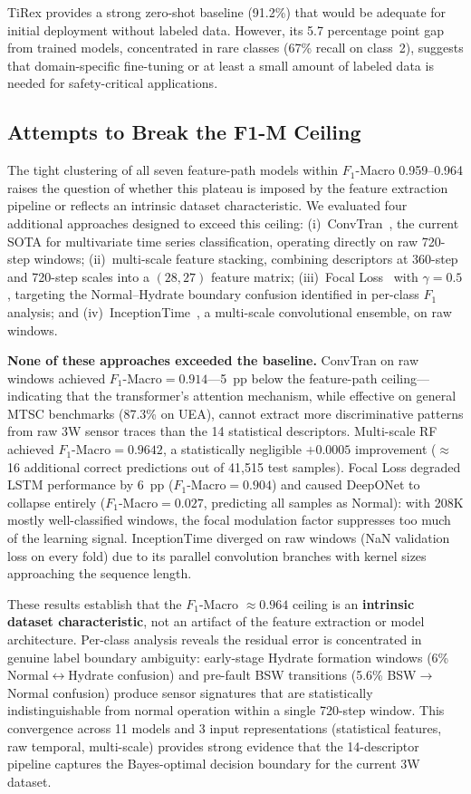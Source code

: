 \documentclass[conference]{IEEEtran}
\begin{document}
TiRex provides a strong zero-shot baseline (91.2\%) that would be adequate for initial deployment without labeled data. However, its 5.7 percentage point gap from trained models, concentrated in rare classes (67\% recall on class~2), suggests that domain-specific fine-tuning or at least a small amount of labeled data is needed for safety-critical applications.

\subsection{Attempts to Break the F1-M Ceiling}

The tight clustering of all seven feature-path models within $F_1$-Macro 0.959--0.964 raises the question of whether this plateau is imposed by the feature extraction pipeline or reflects an intrinsic dataset characteristic. We evaluated four additional approaches designed to exceed this ceiling: (i)~ConvTran~\cite{convtran}, the current SOTA for multivariate time series classification, operating directly on raw 720-step windows; (ii)~multi-scale feature stacking, combining descriptors at 360-step and 720-step scales into a $(28, 27)$ feature matrix; (iii)~Focal Loss~\cite{focalloss} with $\gamma{=}0.5$, targeting the Normal--Hydrate boundary confusion identified in per-class $F_1$ analysis; and (iv)~InceptionTime~\cite{inceptiontime}, a multi-scale convolutional ensemble, on raw windows.

\textbf{None of these approaches exceeded the baseline.} ConvTran on raw windows achieved $F_1$-Macro${=}0.914$---5~pp below the feature-path ceiling---indicating that the transformer's attention mechanism, while effective on general MTSC benchmarks (87.3\% on UEA), cannot extract more discriminative patterns from raw 3W sensor traces than the 14 statistical descriptors. Multi-scale RF achieved $F_1$-Macro${=}0.9642$, a statistically negligible $+0.0005$ improvement ($\approx$16 additional correct predictions out of 41{,}515 test samples). Focal Loss degraded LSTM performance by 6~pp ($F_1$-Macro${=}0.904$) and caused DeepONet to collapse entirely ($F_1$-Macro${=}0.027$, predicting all samples as Normal): with 208K mostly well-classified windows, the focal modulation factor suppresses too much of the learning signal. InceptionTime diverged on raw windows (NaN validation loss on every fold) due to its parallel convolution branches with kernel sizes approaching the sequence length.

These results establish that the $F_1$-Macro $\approx 0.964$ ceiling is an \textbf{intrinsic dataset characteristic}, not an artifact of the feature extraction or model architecture. Per-class analysis reveals the residual error is concentrated in genuine label boundary ambiguity: early-stage Hydrate formation windows (6\% Normal$\leftrightarrow$Hydrate confusion) and pre-fault BSW transitions (5.6\% BSW$\rightarrow$Normal confusion) produce sensor signatures that are statistically indistinguishable from normal operation within a single 720-step window. This convergence across 11 models and 3 input representations (statistical features, raw temporal, multi-scale) provides strong evidence that the 14-descriptor pipeline captures the Bayes-optimal decision boundary for the current 3W dataset.
\end{document}
